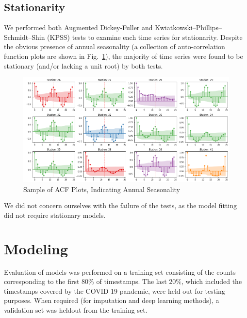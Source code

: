 \documentclass[9pt,twocolumn,twoside, lineno]{jost-new}
\numberwithin{subsection}{section}
\begin{document}
\subsection{Stationarity}
We performed both Augmented Dickey-Fuller and Kwiatkowski–Phillips–Schmidt–Shin (KPSS) tests to examine each time series for stationarity.
Despite the obvious presence of annual seasonality (a collection of auto-correlation function plots are shown in Fig.~\ref{fig:autocorrelations_a1}), the majority of time series were found to be stationary (and/or lacking a unit root) by both tests.
\begin{figure}
\centering
    \includegraphics[width=14.4cm]{figures/autocorrelations_a1.png}
\caption{Sample of ACF Plots, Indicating Annual Seasonality}
\label{fig:autocorrelations_a1}
\end{figure}

We did not concern ourselves with the failure of the tests, as the model fitting did not require stationary models.

\section{Modeling}\label{sec:modeling}
Evaluation of models was performed on a training set consisting of the counts corresponding to the first 80\% of
timestamps.
The last 20\%, which included the timestamps covered by the COVID-19 pandemic, were held out for testing purposes.
When required (for imputation and deep learning methods), a validation set was heldout from the training set.
\end{document}
